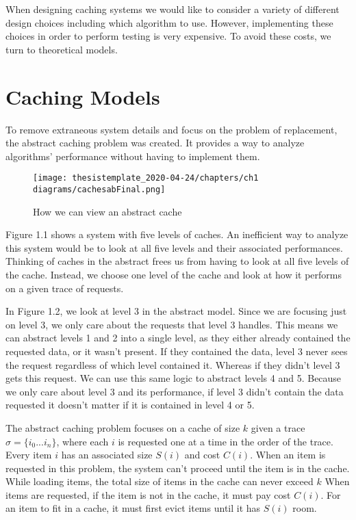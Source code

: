 When designing caching systems we would like to consider a variety of different design choices including which algorithm to use. However, implementing these choices in order to perform testing is very expensive. To avoid these costs, we turn to theoretical models. 


\section{Caching Models}

To remove extraneous system details and focus on the problem of replacement, the abstract caching problem was created. It provides a way to analyze algorithms' performance without having to implement them.   

\begin{figure}[h]
    \texttt{[image: thesistemplate\_2020-04-24/chapters/ch1 diagrams/cachesabFinal.png]}
    \caption{How we can view an abstract cache}
    \label{fig:my_label}
\end{figure}



Figure 1.1 shows a system with five levels of caches. An inefficient way to analyze this system would be to look at all five levels and their associated performances. Thinking of caches in the abstract frees us from having to look at all five levels of the cache. Instead, we choose one level of the cache and look at how it performs on a given trace of requests.


In Figure 1.2, we look at level 3 in the abstract model. Since we are focusing just on level 3, we only care about the requests that level 3 handles. This means we can abstract levels 1 and 2 into a single level, as they either already contained the requested data, or it wasn't present. If they contained the data, level 3 never sees the request regardless of which level contained it. Whereas if they didn't level 3 gets this request. We can use this same logic to abstract levels 4 and 5. Because we only care about level 3 and its performance, if level 3 didn't contain the data requested it doesn't matter if it is contained in level 4 or 5.

The abstract caching problem focuses on a cache of size $k$ given a trace $\sigma = \{i_{0}...i_{n} \}$, where each $i$ is requested one at a time in the order of the trace. Every item $i$ has an associated size $S(i)$ and cost $C(i)$. When an item is requested in this problem, the system can't proceed until the item is in the cache. While loading items, the total size of items in the cache can never exceed $k$
When items are requested, if the item is not in the cache, it must pay cost $C(i)$. For an item to fit in a cache, it must first evict items until it has $S(i)$ room.


